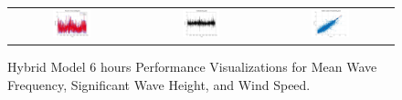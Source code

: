 \begin{figure}[ht!]
\begin{tabular}{ccc}
    \includegraphics[width=0.32\textwidth]{graphs/hybrid/6 hours/wind_speed/actual vs forecast.jpg} &
    \includegraphics[width=0.32\textwidth]{graphs/hybrid/6 hours/wind_speed/residuals.jpg} &
    \includegraphics[width=0.32\textwidth]{graphs/hybrid/6 hours/wind_speed/scatter plot.jpg} \\
  \end{tabular}
  \caption{Hybrid Model 6 hours Performance Visualizations for Mean Wave Frequency, Significant Wave Height, and Wind Speed.}
  \label{fig:hybrid_6_hours}
\end{figure}


